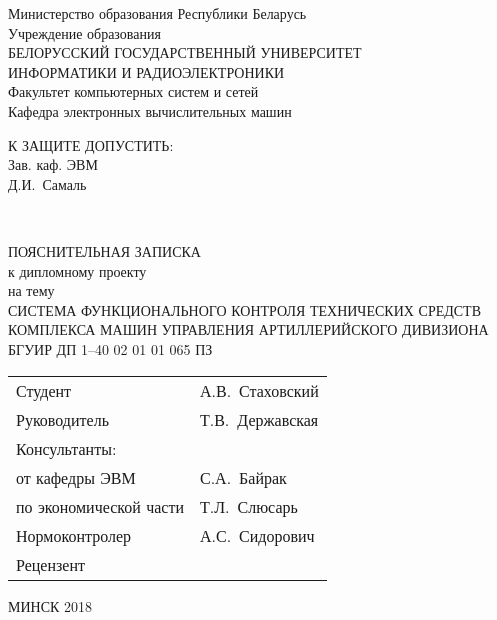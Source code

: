 \begin{titlepage}
  \begin{center}
    Министерство образования Республики Беларусь \\[1em]
    Учреждение образования \\
    БЕЛОРУССКИЙ ГОСУДАРСТВЕННЫЙ УНИВЕРСИТЕТ \\
    ИНФОРМАТИКИ И РАДИОЭЛЕКТРОНИКИ \\[1em]

    Факультет компьютерных систем и сетей \\ [1em]
    Кафедра электронных вычислительных машин \\[2em]

    \begin{flushright}
      \begin{minipage}{0.4\textwidth}
        К ЗАЩИТЕ ДОПУСТИТЬ: \\
        Зав. каф. ЭВМ \\
        \underline{\hspace*{2.8cm}} Д.И.~Самаль
      \end{minipage}\\[2.2em]
    \end{flushright}

    {ПОЯСНИТЕЛЬНАЯ ЗАПИСКА}\\
    {к дипломному проекту}\\
    {на тему}\\
    {СИСТЕМА ФУНКЦИОНАЛЬНОГО КОНТРОЛЯ ТЕХНИЧЕСКИХ СРЕДСТВ КОМПЛЕКСА МАШИН УПРАВЛЕНИЯ АРТИЛЛЕРИЙСКОГО ДИВИЗИОНА}\\[2em]


    {БГУИР ДП 1--40 02 01 01 065 ПЗ}\\[2em]

	  \begin{tabular}{>{\raggedright}p{}p{} }
      Студент & А.В.~Стаховский\\[1em]
      Руководитель & Т.В.~Державская \\[1em]
      Консультанты: &\\[1em]
      \hspace*{3ex}от кафедры ЭВМ & С.А.~Байрак \\[1em]
      \hspace*{3ex}по экономической части & Т.Л.~Слюсарь \\[1em]
      Нормоконтролер & А.С.~Сидорович\\[1em]
      Рецензент &
    \end{tabular}

    \vfill
    {\normalsize МИНСК 2018}
  \end{center}
\end{titlepage}
